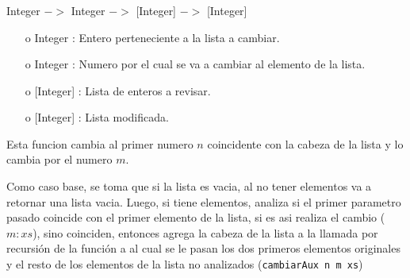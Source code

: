 \documentclass[10pt,journal]{IEEEtran}
\begin{document}
\subsubsection{\color{Red}{cambiarAux}}
\begin{description}[style=nextline]
        \item[\color{Green}{Signatura}] Integer $->$ Integer $->$ [Integer] $->$ [Integer] 
        \begin{itemize} 
        \item [o]  Integer : Entero perteneciente a la lista a cambiar. 
        \item [o]  Integer : Numero por el cual se va a cambiar al elemento de la lista.  
        \item [o] [Integer] : Lista de enteros a revisar.
        \item [o] [Integer] : Lista modificada.       
        \end{itemize}        
        
        \item[\color{Green}{Descripción}] Esta funcion cambia al primer numero $n$ coincidente con la cabeza de la lista y lo cambia por el numero $m$. 
        
        Como caso base, se toma que si la lista es vacia, al no tener elementos va a retornar una lista vacia. Luego, si tiene elementos, analiza si el primer parametro pasado coincide con el primer elemento de la lista, si es asi realiza el cambio ($m:xs$), sino coinciden, entonces agrega la cabeza de la lista a la llamada por recursión de la función a al cual se le pasan los dos primeros elementos originales y el resto de los elementos de la lista no analizados (\texttt{cambiarAux n m xs})  
        
\end{description}
\end{document}
